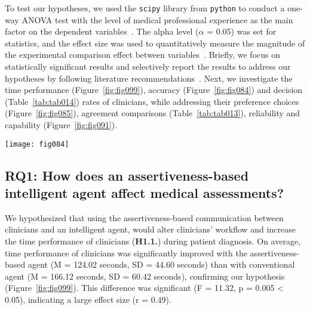 To test our hypotheses, we used the \texttt{scipy} library from \texttt{python} to conduct a one-way ANOVA test with the level of medical professional experience as the main factor on the dependent variables~\cite{CASALE2022107302}.
The alpha level ($\alpha$ = 0.05) was set for statistics, and the effect size was used to quantitatively measure the magnitude of the experimental comparison effect between variables~\cite{Yigit_Mendes_2018, 10.1145/3180155.3182556}.
Briefly, we focus on statistically significant results and selectively report the results to address our hypotheses by following literature recommendations~\cite{10.1145/3301275.3302289, 10.1145/3290605.3300234, 10.1145/3491102.3517791}.
Next, we investigate the time performance (Figure~\ref{fig:fig099}), accuracy (Figure~\ref{fig:fig084}) and decision (Table~\ref{tab:tab014}) rates of clinicians, while addressing their preference choices (Figure~\ref{fig:fig085}), agreement comparisons (Table~\ref{tab:tab013}), reliability and capability (Figure~\ref{fig:fig091}).

\begin{figure*}[htpb]
\centering
\texttt{[image: fig084]}
\caption[]{Accuracy rates using a confusion matrix. Comparison between the clinician's BIRADS classification (from 1 to 5) of a patient while using both conventional (left) and assertiveness-based (right) agents. Columns are representing the {\it Predicted} value (collaboration between the clinician and AI), and the rows are representing the {\it Actual} category (biopsy confirmed).}
\label{fig:fig084}
\end{figure*}

\subsection{RQ1: How does an assertiveness-based intelligent agent affect medical assessments?}
\label{sec:chap006006001}

We hypothesized that using the assertiveness-based communication between clinicians and an intelligent agent, would alter clinicians' workflow and increase the time performance of clinicians ({\bf H1.1.}) during patient diagnosis.
On average, time performance of clinicians was significantly improved with the assertiveness-based agent (M = 124.02 seconds, SD = 44.60 seconds) than with conventional agent (M = 166.12 seconds, SD = 60.42 seconds), confirming our hypothesis (Figure~\ref{fig:fig099}).
This difference was significant (F = 11.32, p = 0.005 < 0.05), indicating a large effect size (r = 0.49).

